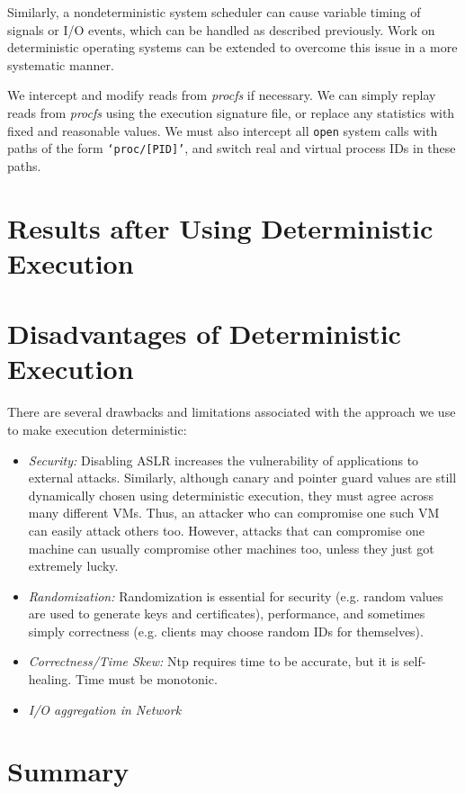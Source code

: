 Similarly, a nondeterministic system scheduler
can cause variable timing of signals
or I/O events, which
can be handled as described previously.
Work on deterministic
operating systems can
be extended to overcome this issue
in a more systematic manner. \newline

 \newline
We intercept and modify reads 
from {\em procfs} if necessary. We can simply 
replay reads from {\em procfs} using the execution signature
file, or replace any statistics with fixed and 
reasonable values. We must also intercept
all \texttt{open} system calls with paths
of the form \texttt{`proc/[PID]'},
and switch real and virtual process IDs
in these paths.

\section{Results after Using Deterministic Execution} \label{ch3:data}

\section{Disadvantages of Deterministic Execution} \label{ch3:issues}
There are several drawbacks and limitations associated with the approach we use
to make execution deterministic:
\begin{itemize}
\item {\em Security:} \newline
Disabling ASLR increases the vulnerability of
applications to external attacks. Similarly, although canary and pointer guard
values are still dynamically chosen using deterministic
execution, they must agree across many different VMs. Thus,
an attacker who can compromise one such VM can easily
attack others too. However, attacks
that can compromise one machine can usually compromise
other machines too, unless they just got extremely lucky.
\item {\em Randomization:} \newline
Randomization is essential for security (e.g. random values
are used to generate keys and certificates),
performance, and sometimes simply correctness (e.g. 
clients may choose random IDs for themselves). 
\item{\em Correctness/Time Skew:} \newline
Ntp requires time to be accurate, but it is self-healing.
Time must be monotonic.
\item{\em I/O aggregation in Network} \newline



\end{itemize}

\section {Summary}
